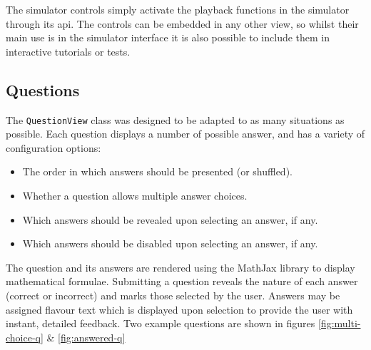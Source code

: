 \documentclass[bsc,twoside,singlespacing,parskip,logo,notimes,normalheadings]{infthesis}
\begin{document}
        The simulator controls simply activate the playback functions
        in the simulator through its \gls{api}. The controls can be
        embedded in any other view, so whilst their main use is in the
        simulator interface it is also possible to include them in
        interactive tutorials or tests.

        \subsection{Questions}
        The {\tt QuestionView} class was designed to be adapted to as
        many situations as possible. Each question displays a number
        of possible answer, and has a variety of configuration
        options:

        \begin{itemize}
        \item The order in which answers should be presented (or
          shuffled).
        \item Whether a question allows multiple answer choices.
        \item Which answers should be revealed upon selecting an
          answer, if any.
        \item Which answers should be disabled upon selecting an
          answer, if any.
        \end{itemize}

        The question and its answers are rendered using the MathJax
        library to display mathematical formulae. Submitting a
        question reveals the nature of each answer (correct or
        incorrect) and marks those selected by the user. Answers may
        be assigned flavour text which is displayed upon selection to
        provide the user with instant, detailed feedback. Two example
        questions are shown in figures \ref{fig:multi-choice-q} \&
        \ref{fig:answered-q}
\end{document}

